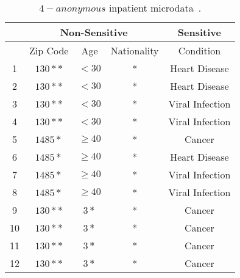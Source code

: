 \begin{table}[htbp]
    \centering
    \begin{tabular}{|c||c|c|c||c|}
        \hline \multicolumn{1}{|c||}{} & \multicolumn{3}{c||}{ Non-Sensitive } & Sensitive                                 \\
        \hline                         & Zip Code                              & Age       & Nationality & Condition       \\
        \hline 1                       & $130**$                               & $<30$     & *           & Heart Disease   \\
        2                              & $130**$                               & $<30$     & *           & Heart Disease   \\
        3                              & $130**$                               & $<30$     & *           & Viral Infection \\
        4                              & $130**$                               & $<30$     & *           & Viral Infection \\
        \hline 5                       & $1485*$                               & $\geq 40$ & *           & Cancer          \\
        6                              & $1485*$                               & $\geq 40$ & *           & Heart Disease   \\
        7                              & $1485*$                               & $\geq 40$ & *           & Viral Infection \\
        8                              & $1485*$                               & $\geq 40$ & *           & Viral Infection \\
        \hline 9                       & $130**$                               & $3*$      & *           & Cancer          \\
        10                             & $130**$                               & $3*$      & *           & Cancer          \\
        11                             & $130**$                               & $3*$      & *           & Cancer          \\
        12                             & $130**$                               & $3*$      & *           & Cancer          \\
        \hline
    \end{tabular}
    \caption{$4-anonymous$ inpatient microdata~\cite{machanavajjhala2007diversity}.}
    \label{tabular:4-anonymousinpatientmicrodata}
\end{table}
\FloatBarrier

